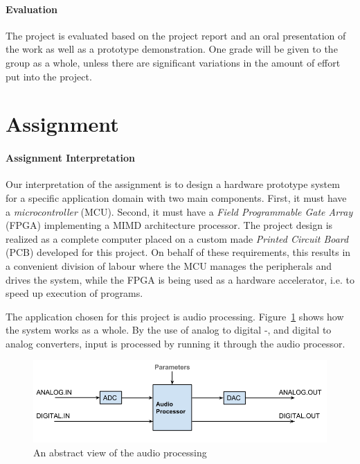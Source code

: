 \paragraph{Evaluation}
The project is evaluated based on the project report and an oral presentation of
the work as well as a prototype demonstration. One grade will be given to the
group as a whole, unless there are significant variations in the amount of
effort put into the project.

\section{Assignment}

\paragraph{Assignment Interpretation}\label{intro:our-assignment-interpretation}
Our interpretation of the assignment is to design a hardware prototype system
for a specific application domain with two main components. First, it must have
a \textit{microcontroller} (MCU). Second, it must have a \textit{Field
Programmable Gate Array} (FPGA) implementing a MIMD architecture processor. The
project design is realized as a complete computer placed on a custom made
\textit{Printed Circuit Board} (PCB) developed for this project. On behalf of
these requirements, this results in a convenient division of labour where the
MCU manages the peripherals and drives the system, while the FPGA is being used
as a hardware accelerator, i.e. to speed up execution of programs.

The application chosen for this project is audio processing.
Figure~\ref{fig:audio_path_overview} shows how the system works as a whole. By
the use of analog to digital -, and digital to analog converters, input is
processed by running it through the audio processor.

\begin{figure}[H]
    \centering
    \includegraphics[scale=0.4]{figures/intro/intro_audio_analog_digital.png}
    \caption{An abstract view of the audio processing}
    \label{fig:audio_path_overview}
\end{figure}

